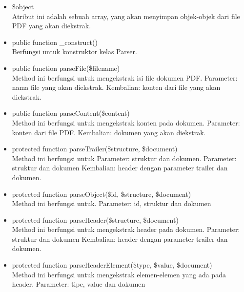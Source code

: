 \begin{itemize}
	\item \$object \\
	Atribut ini adalah sebuah array, yang akan menyimpan objek-objek dari file PDF yang akan diekstrak.

	\item public function \_construct() \\
	Berfungsi untuk konstruktor kelas Parser.
	
	\item public function parseFile(\$filename) \\
	Method ini berfungsi untuk mengekstrak isi file dokumen PDF. \newline
	Parameter: nama file yang akan diekstrak. \newline
	Kembalian: konten dari file yang akan diekstrak.
	
	\item public function parseContent(\$content) \\
	Method ini berfungsi untuk mengekstrak konten pada dokumen. \newline
	Parameter: konten dari file PDF. \newline
	Kembalian: dokumen yang akan diekstrak.
	
	\item protected function parseTrailer(\$structure, \$document) \\
	Method ini berfungsi untuk Parameter: struktur dan dokumen.
	Parameter: struktur dan dokumen \newline
	Kembalian: header dengan parameter trailer dan dokumen.
	
	\item protected function parseObject(\$id, \$structure, \$document) \\
	Method ini berfungsi untuk.
	Parameter: id, struktur dan dokumen
	
	\item protected function parseHeader(\$structure, \$document) \\
	Method ini berfungsi untuk mengekstrak header pada dokumen. \newline
	Parameter: struktur dan dokumen \newline	
	Kembalian: header dengan parameter trailer dan dokumen.
	
	\item protected function parseHeaderElement(\$type, \$value, \$document) \\
	Method ini berfungsi untuk mengekstrak elemen-elemen yang ada pada header. \newline
	Parameter: tipe, value dan dokumen
\end{itemize}


